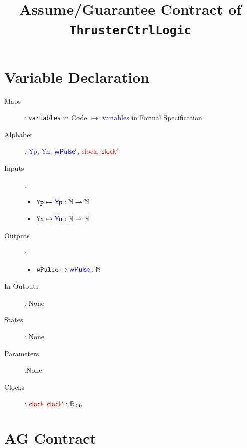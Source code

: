 \documentclass[fleqn,a4paper]{article}
\newcommand\var[1]{\texttt{#1}}
\newcommand\Var[1]{\textcolor{blue}{\textsf{#1}}}
\newcommand\clock{\textcolor{red}{\textsf{clock}}}
\begin{document}
\title{Assume/Guarantee Contract of \texttt{ThrusterCtrlLogic}}
\author{}

\maketitle

\section{Variable Declaration}

\begin{description}
\item[Maps]:
\var{variables} in Code $\mapsto$ \Var{variables} in Formal Specification

\item[Alphabet]:
\Var{Yp},
\Var{Yn},
$\Var{wPulse}'$,
\clock,
$\clock'$

\item[Inputs]:
\begin{itemize}
\item $\var{Yp} \mapsto \Var{Yp} : \mathbb{N} \rightharpoonup \mathbb{N}$
\item $\var{Yn} \mapsto \Var{Yn} : \mathbb{N} \rightharpoonup \mathbb{N}$
\end{itemize}

\item[Outputs]:
\begin{itemize}
\item $\var{wPulse} \mapsto \Var{wPulse} : \mathbb{N}$
\end{itemize}

\item[In-Outputs]: None

\item[States]: None

\item[Parameters]:None

\item[Clocks]:
$\clock, \clock' : \mathbb{R}_{\geq 0}$

\end{description}

\section{AG Contract}
\end{document}
